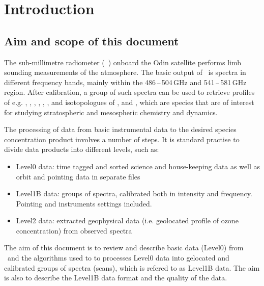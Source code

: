 \chapter{Introduction}
\label{chapter:introduction}

\setcounter{page}{1}


\section{Aim and scope of this document}
\label{sec:aim}

The sub-millimetre radiometer (\SMR\ ) onboard the Odin satellite
performs limb sounding measurements of the atmosphere.
The basic output of \smr\ is spectra in different frequency
bands, mainly within the 486\,--\,504\,GHz and 541\,--\,581\,GHz region.
After calibration, a group of such spectra can be used
to retrieve profiles of e.g. , , , , 
, , and isotopologues of , and ,
which are species that are of interest for studying stratospheric and 
mesospheric chemistry and dynamics. 

The processing of data from basic instrumental data to the
desired species concentration product involves a number of steps.
It is standard practise to divide data products into different levels, such  as:

\begin{itemize}

\item Level0 data: time tagged and sorted science and house-keeping data
as well as orbit and pointing data in separate files

\item Level1B data: groups of spectra, calibrated both in intensity and frequency. 
Pointing and instruments settings included.

\item Level2 data: extracted geophysical data (i.e. geolocated profile
of ozone concentration) from observed spectra

\end{itemize}


The aim of this document is to review and describe basic
data (Level0) from \smr\ and the algorithms used to 
to processes Level0 data into gelocated and calibrated 
groups of spectra (scans), which is refered to as Level1B data. 
The aim is also to describe the Level1B data format and 
the quality of the data.

